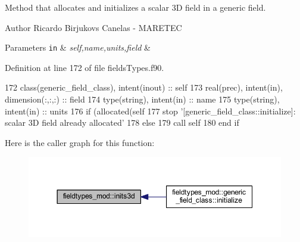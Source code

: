 Method that allocates and initializes a scalar 3D field in a generic field. 

\begin{DoxyAuthor}{Author}
Ricardo Birjukovs Canelas -\/ M\+A\+R\+E\+T\+EC 
\end{DoxyAuthor}

\begin{DoxyParams}[1]{Parameters}
\mbox{\tt in}  & {\em self,name,units,field} & \\
\hline
\end{DoxyParams}


Definition at line 172 of file fields\+Types.\+f90.


\begin{DoxyCode}
172     \textcolor{keywordtype}{class}(generic\_field\_class), \textcolor{keywordtype}{intent(inout)} :: self
173     \textcolor{keywordtype}{real(prec)}, \textcolor{keywordtype}{intent(in)}, \textcolor{keywordtype}{dimension(:,:,:)} :: field
174     \textcolor{keywordtype}{type}(string), \textcolor{keywordtype}{intent(in)} :: name
175     \textcolor{keywordtype}{type}(string), \textcolor{keywordtype}{intent(in)} :: units
176     \textcolor{keywordflow}{if} (\textcolor{keyword}{allocated}(self%
177         stop \textcolor{stringliteral}{'[generic\_field\_class::initialize]: scalar 3D field already allocated'}
178     \textcolor{keywordflow}{else}
179         \textcolor{keyword}{call }self%
180 \textcolor{keywordflow}{    end if}
\end{DoxyCode}
Here is the caller graph for this function\+:\nopagebreak
\begin{figure}[H]
\begin{center}
\leavevmode
\includegraphics[width=350pt]{namespacefieldtypes__mod_a750ce2c729d98ea7031c839a3a5ebd7c_icgraph}
\end{center}
\end{figure}
\mbox{\label{namespacefieldtypes__mod_a1987bd94293cfd9e35016ac5992501cd}} 

